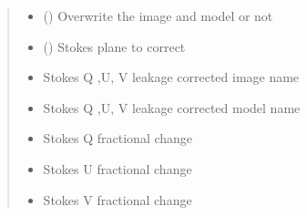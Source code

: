 \documentclass[letterpaper,10pt,english]{sphinxmanual}
\begin{document}
\begin{fulllineitems}
\begin{fulllineitems}
\begin{quote}
\begin{description}
\begin{itemize}
\item {} 
\sphinxAtStartPar
{} () \textendash{} Overwrite the image and model or not

\item {} 
\sphinxAtStartPar
{} () \textendash{} Stokes plane to correct

\end{itemize}

\item[{Returns}] \leavevmode
\sphinxAtStartPar
\begin{itemize}
\item {} 
\sphinxAtStartPar
{} \textendash{} Stokes Q ,U, V leakage corrected image name

\item {} 
\sphinxAtStartPar
{} \textendash{} Stokes Q ,U, V leakage corrected model name

\item {} 
\sphinxAtStartPar
{} \textendash{} Stokes Q fractional change

\item {} 
\sphinxAtStartPar
{} \textendash{} Stokes U fractional change

\item {} 
\sphinxAtStartPar
{} \textendash{} Stokes V fractional change

\end{itemize}


\end{description}\end{quote}

\end{fulllineitems}



\end{fulllineitems}
\end{document}
